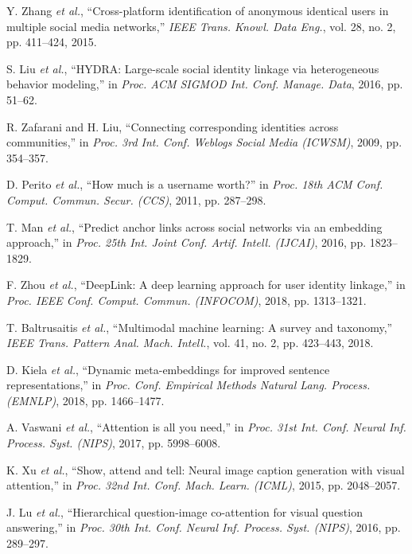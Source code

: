 \documentclass[conference]{IEEEtran}
\begin{document}
\begin{thebibliography}{00}
 Y. Zhang \emph{et al.}, ``Cross-platform identification of anonymous identical users in multiple social media networks,'' \emph{IEEE Trans. Knowl. Data Eng.}, vol. 28, no. 2, pp. 411--424, 2015.

 S. Liu \emph{et al.}, ``HYDRA: Large-scale social identity linkage via heterogeneous behavior modeling,'' in \emph{Proc. ACM SIGMOD Int. Conf. Manage. Data}, 2016, pp. 51--62.

 R. Zafarani and H. Liu, ``Connecting corresponding identities across communities,'' in \emph{Proc. 3rd Int. Conf. Weblogs Social Media (ICWSM)}, 2009, pp. 354--357.

 D. Perito \emph{et al.}, ``How much is a username worth?'' in \emph{Proc. 18th ACM Conf. Comput. Commun. Secur. (CCS)}, 2011, pp. 287--298.

 T. Man \emph{et al.}, ``Predict anchor links across social networks via an embedding approach,'' in \emph{Proc. 25th Int. Joint Conf. Artif. Intell. (IJCAI)}, 2016, pp. 1823--1829.

 F. Zhou \emph{et al.}, ``DeepLink: A deep learning approach for user identity linkage,'' in \emph{Proc. IEEE Conf. Comput. Commun. (INFOCOM)}, 2018, pp. 1313--1321.

 T. Baltrusaitis \emph{et al.}, ``Multimodal machine learning: A survey and taxonomy,'' \emph{IEEE Trans. Pattern Anal. Mach. Intell.}, vol. 41, no. 2, pp. 423--443, 2018.

 D. Kiela \emph{et al.}, ``Dynamic meta-embeddings for improved sentence representations,'' in \emph{Proc. Conf. Empirical Methods Natural Lang. Process. (EMNLP)}, 2018, pp. 1466--1477.

 A. Vaswani \emph{et al.}, ``Attention is all you need,'' in \emph{Proc. 31st Int. Conf. Neural Inf. Process. Syst. (NIPS)}, 2017, pp. 5998--6008.

 K. Xu \emph{et al.}, ``Show, attend and tell: Neural image caption generation with visual attention,'' in \emph{Proc. 32nd Int. Conf. Mach. Learn. (ICML)}, 2015, pp. 2048--2057.

 J. Lu \emph{et al.}, ``Hierarchical question-image co-attention for visual question answering,'' in \emph{Proc. 30th Int. Conf. Neural Inf. Process. Syst. (NIPS)}, 2016, pp. 289--297.


\end{thebibliography}
\end{document}
